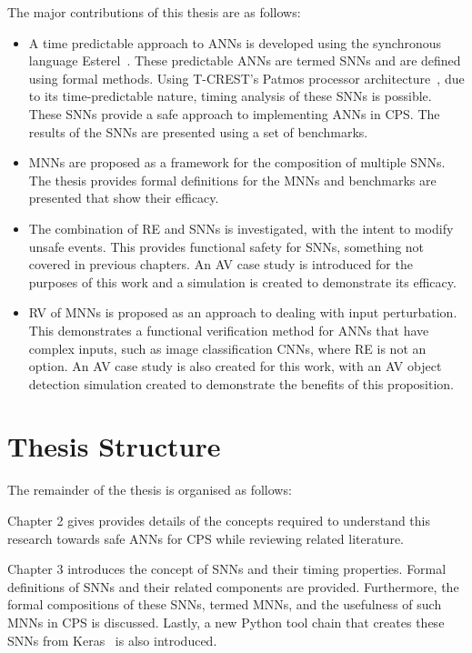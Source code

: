 The major contributions of this thesis are as follows:
\begin{itemize}
	\item A time predictable approach to \acp{ANN} is developed using the synchronous language Esterel~\cite{berry2000foundations}. These predictable \acp{ANN} are termed \acfp{SNN} and are defined using formal methods. Using T-CREST's Patmos processor architecture~\cite{patmos:ppes2011}, due to its time-predictable nature, timing analysis of these \acp{SNN} is possible. These \acp{SNN} provide a safe approach to implementing \acp{ANN} in \ac{CPS}. The results of the \acp{SNN} are presented using a set of benchmarks. 
	\item \acfp{MNN} are proposed as a framework for the composition of multiple \acp{SNN}. The thesis provides formal definitions for the \acp{MNN} and benchmarks are presented that show their efficacy. 
	\item The combination of \acf{RE} and \acp{SNN} is investigated, with the intent to modify unsafe events. This provides functional safety for \acp{SNN}, something not covered in previous chapters. An \acf{AV} case study is introduced for the purposes of this work and a simulation is created to demonstrate its efficacy.
	\item \acf{RV} of \acp{MNN} is proposed as an approach to dealing with input perturbation. This demonstrates a functional verification method for \acp{ANN} that have complex inputs, such as image classification \acfp{CNN}, where \ac{RE} is not an option. An \acf{AV} case study is also created for this work, with an \ac{AV} object detection simulation created to demonstrate the benefits of this proposition. 
\end{itemize}

\section{Thesis Structure}
The remainder of the thesis is organised as follows:

Chapter 2 gives provides details of the concepts required to understand this research towards safe \acp{ANN} for \ac{CPS} while reviewing related literature.

Chapter 3 introduces the concept of \acfp{SNN} and their timing properties.
Formal definitions of \acp{SNN} and their related components are provided.
Furthermore, the formal compositions of these \acp{SNN}, termed \acp{MNN}, and the usefulness of such \acp{MNN} in \ac{CPS} is discussed.
Lastly, a new Python tool chain that creates these \acp{SNN} from Keras~\cite{chollet2015keras} is also introduced.

